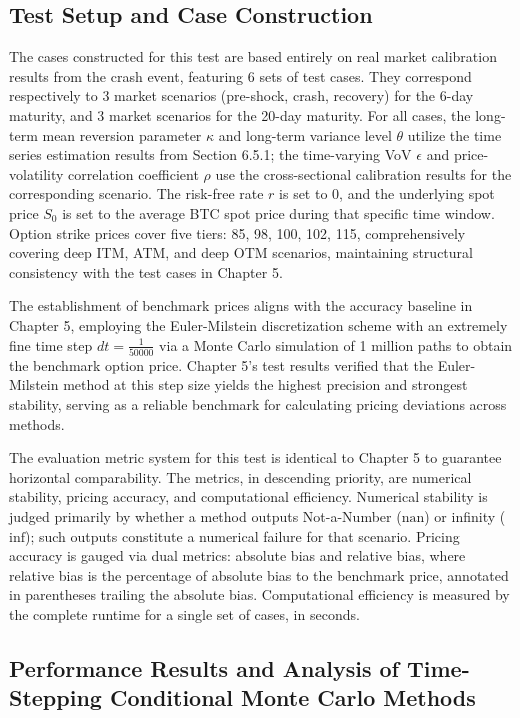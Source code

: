\subsection{Test Setup and Case Construction}

The cases constructed for this test are based entirely on real market calibration results from the crash event, featuring 6 sets of test cases. They correspond respectively to 3 market scenarios (pre-shock, crash, recovery) for the 6-day maturity, and 3 market scenarios for the 20-day maturity. For all cases, the long-term mean reversion parameter $\kappa$ and long-term variance level $\theta$ utilize the time series estimation results from Section 6.5.1; the time-varying VoV $\epsilon$ and price-volatility correlation coefficient $\rho$ use the cross-sectional calibration results for the corresponding scenario. The risk-free rate $r$ is set to 0, and the underlying spot price $S_0$ is set to the average BTC spot price during that specific time window. Option strike prices cover five tiers: 85, 98, 100, 102, 115, comprehensively covering deep ITM, ATM, and deep OTM scenarios, maintaining structural consistency with the test cases in Chapter 5.

The establishment of benchmark prices aligns with the accuracy baseline in Chapter 5, employing the Euler-Milstein discretization scheme with an extremely fine time step $dt = \frac{1}{50000}$ via a Monte Carlo simulation of 1 million paths to obtain the benchmark option price. Chapter 5's test results verified that the Euler-Milstein method at this step size yields the highest precision and strongest stability, serving as a reliable benchmark for calculating pricing deviations across methods.

The evaluation metric system for this test is identical to Chapter 5 to guarantee horizontal comparability. The metrics, in descending priority, are numerical stability, pricing accuracy, and computational efficiency. Numerical stability is judged primarily by whether a method outputs Not-a-Number ($\mathrm{nan}$) or infinity ($\mathrm{inf}$); such outputs constitute a numerical failure for that scenario. Pricing accuracy is gauged via dual metrics: absolute bias and relative bias, where relative bias is the percentage of absolute bias to the benchmark price, annotated in parentheses trailing the absolute bias. Computational efficiency is measured by the complete runtime for a single set of cases, in seconds.

\subsection{Performance Results and Analysis of Time-Stepping Conditional Monte Carlo Methods}

